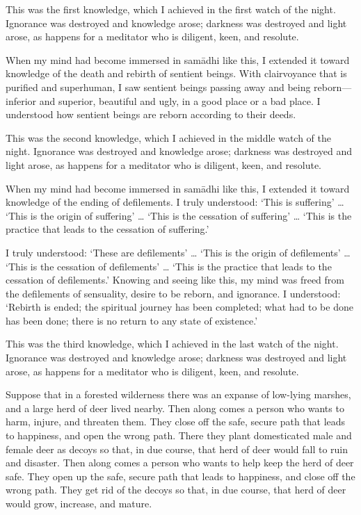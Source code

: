 \documentclass[12pt,openany]{book}%
\begin{document}
This was the first knowledge, which I achieved in the first watch of the night. Ignorance was destroyed and knowledge arose; darkness was destroyed and light arose, as happens for a meditator who is diligent, keen, and resolute. 

When my mind had become immersed in \textsanskrit{samādhi} like this, I extended it toward knowledge of the death and rebirth of sentient beings. With clairvoyance that is purified and superhuman, I saw sentient beings passing away and being reborn—inferior and superior, beautiful and ugly, in a good place or a bad place. I understood how sentient beings are reborn according to their deeds. 

This was the second knowledge, which I achieved in the middle watch of the night. Ignorance was destroyed and knowledge arose; darkness was destroyed and light arose, as happens for a meditator who is diligent, keen, and resolute. 

When my mind had become immersed in \textsanskrit{samādhi} like this, I extended it toward knowledge of the ending of defilements. I truly understood: ‘This is suffering’ … ‘This is the origin of suffering’ … ‘This is the cessation of suffering’ … ‘This is the practice that leads to the cessation of suffering.' 

I truly understood: ‘These are defilements’ … ‘This is the origin of defilements’ … ‘This is the cessation of defilements’ … ‘This is the practice that leads to the cessation of defilements.' Knowing and seeing like this, my mind was freed from the defilements of sensuality, desire to be reborn, and ignorance. I understood: ‘Rebirth is ended; the spiritual journey has been completed; what had to be done has been done; there is no return to any state of existence.’ 

This was the third knowledge, which I achieved in the last watch of the night. Ignorance was destroyed and knowledge arose; darkness was destroyed and light arose, as happens for a meditator who is diligent, keen, and resolute. 

Suppose that in a forested wilderness there was an expanse of low-lying marshes, and a large herd of deer lived nearby. Then along comes a person who wants to harm, injure, and threaten them. They close off the safe, secure path that leads to happiness, and open the wrong path. There they plant domesticated male and female deer as decoys so that, in due course, that herd of deer would fall to ruin and disaster. Then along comes a person who wants to help keep the herd of deer safe. They open up the safe, secure path that leads to happiness, and close off the wrong path. They get rid of the decoys so that, in due course, that herd of deer would grow, increase, and mature. 
\end{document}

